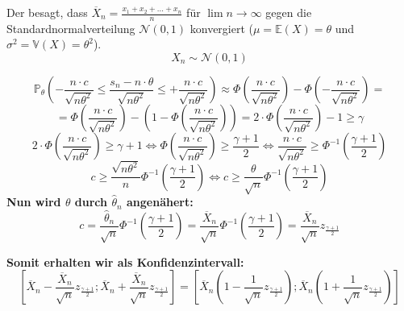 \begin{uebsp}
\begin{Answer}
\begin{uebsp_theory}
Der  besagt, dass $\overline X_n=\frac{x_1+x_2+...+x_n}{n}$ für $\lim n\rightarrow\infty$ gegen die Standardnormalverteilung $\mathcal N(0,1)$ konvergiert ($\mu=\mathbb{E}(X)=\theta$ und $\sigma^2=\mathbb{V}(X)=\theta^2$).
\[X_n\sim\mathcal N(0,1)\]
\end{uebsp_theory}
\[\mathbb{P}_\theta(-\frac{n\cdot c}{\sqrt{n\theta^2}}\leq \frac{s_n-n\cdot\theta}{\sqrt{n\theta^2}}\leq+\frac{n\cdot c}{\sqrt{n\theta^2}})\approx\Phi\left(\frac{n\cdot c}{\sqrt{n\theta^2}}\right)-\Phi\left(-\frac{n\cdot c}{\sqrt{n\theta^2}}\right)=\]
\[=\Phi\left(\frac{n\cdot c}{\sqrt{n\theta^2}}\right)-\left(1-\Phi\left(\frac{n\cdot c}{\sqrt{n\theta^2}}\right)\right)=2\cdot \Phi\left(\frac{n\cdot c}{\sqrt{n\theta^2}}\right)-1\geq\gamma\]
\[2\cdot \Phi\left(\frac{n\cdot c}{\sqrt{n\theta^2}}\right)\geq\gamma+1\Leftrightarrow \Phi\left(\frac{n\cdot c}{\sqrt{n\theta^2}}\right)\geq\frac{\gamma+1}{2}\Leftrightarrow \frac{n\cdot c}{\sqrt{n\theta^2}}\geq\Phi^{-1}\left(\frac{\gamma+1}{2}\right)\]
\[c\geq\frac{\sqrt{n\theta^2}}{n}\Phi^{-1}\left(\frac{\gamma+1}{2}\right)\Leftrightarrow c\geq\frac{\theta}{\sqrt n}\Phi^{-1}\left(\frac{\gamma+1}{2}\right)\]
\textbf{Nun wird $\theta$ durch $\hat\theta_n$ angenähert:}
\[c=\frac{\hat\theta_n}{\sqrt{n}}\Phi^{-1}\left(\frac{\gamma+1}{2}\right)=\frac{\overline X_n}{\sqrt{n}}\Phi^{-1}\left(\frac{\gamma+1}{2}\right)=\frac{\overline X_n}{\sqrt{n}}z_{\frac{\gamma+1}{2}}\]

\textbf{Somit erhalten wir als Konfidenzintervall:}
\[\left[\overline X_n-\frac{\overline X_n}{\sqrt{n}}z_{\frac{\gamma+1}{2}};\overline X_n+\frac{\overline X_n}{\sqrt{n}}z_{\frac{\gamma+1}{2}}\right]=\left[\overline X_n\left(1-\frac{1}{\sqrt{n}}z_{\frac{\gamma+1}{2}}\right);\overline X_n\left(1+\frac{1}{\sqrt{n}}z_{\frac{\gamma+1}{2}}\right)\right]\]
\end{Answer}
\end{uebsp}
